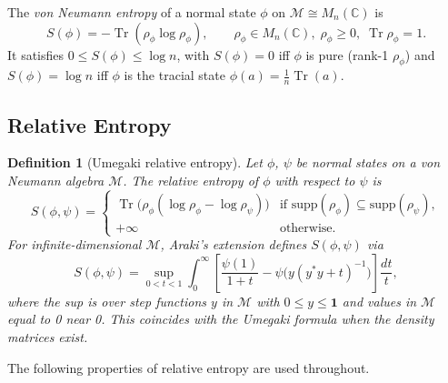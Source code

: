 \documentclass[12pt,a4paper]{article}
\newtheorem{definition}[theorem]{Definition}
\newcommand{\CC}{\mathbb{C}}
\newcommand{\Tr}{\operatorname{Tr}}
\newcommand{\id}{\mathbf{1}}  %
\newcommand{\Mn}{M_n(\CC)}
\newcommand{\vN}{\mathcal{M}}      %
\newcommand{\Srel}{S}              %
\begin{document}
The \emph{von Neumann entropy} of a normal state $\phi$ on $\vN\cong\Mn$ is
\begin{equation}\label{eq:vn_entropy}
  S(\phi) = -\Tr(\rho_\phi \log\rho_\phi),
  \qquad \rho_\phi \in \Mn,\; \rho_\phi \ge 0,\; \Tr\rho_\phi = 1.
\end{equation}
It satisfies $0\le S(\phi)\le \log n$, with $S(\phi)=0$ iff $\phi$ is pure
(rank-1 $\rho_\phi$) and $S(\phi)=\log n$ iff $\phi$ is the tracial state
$\phi(a)=\frac{1}{n}\Tr(a)$.

\subsection{Relative Entropy}

\begin{definition}[Umegaki relative entropy]\label{def:relative_entropy}
Let $\phi$, $\psi$ be normal states on a von Neumann algebra $\vN$.
The \emph{relative entropy} of $\phi$ with respect to $\psi$ is
\begin{equation}\label{eq:relative_entropy}
  \Srel(\phi,\psi)
  = \begin{cases}
      \Tr\bigl(\rho_\phi(\log\rho_\phi - \log\rho_\psi)\bigr)
        & \text{if } \mathrm{supp}(\rho_\phi)\subseteq\mathrm{supp}(\rho_\psi), \\
      +\infty & \text{otherwise.}
    \end{cases}
\end{equation}
For infinite-dimensional $\vN$, Araki's extension defines $\Srel(\phi,\psi)$ via
\begin{equation}\label{eq:araki_relative}
  \Srel(\phi,\psi)
  = \sup_{0<t<1}\int_0^\infty
    \left[\frac{\psi(1)}{1+t} - \psi\bigl(y(y^*y+t)^{-1}\bigr)\right]\frac{dt}{t},
\end{equation}
where the sup is over step functions $y$ in $\vN$ with $0\le y\le \id$ and
values in $\vN$ equal to 0 near 0.  This coincides with the Umegaki formula
when the density matrices exist.
\end{definition}

The following properties of relative entropy are used throughout.
\end{document}
